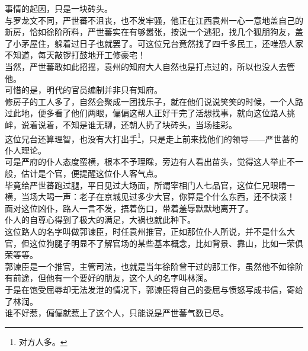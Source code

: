 \begin{multicols}{\theparacolNo}
事情的起因，只是一块砖头。\\

与罗龙文不同，严世蕃不沮丧，也不发牢骚，他正在江西袁州一心一意地盖自己的新房，恰如徐阶所料，严世蕃实在有够嚣张，按说一个逃犯，找几个狐朋狗友，盖了小茅屋住，躲着过日子也就罢了。可这位兄台竟然找了四千多民工，还唯恐人家不知道，每天敲锣打鼓地开工修豪宅！\\

当然，严世蕃敢如此招摇，袁州的知府大人自然也是打点过的，所以也没人去管他。\\

可惜的是，明代的官员编制并非只有知府。\\

修房子的工人多了，自然会聚成一团找乐子，就在他们说说笑笑的时候，一个人路过此地，便多看了他们两眼，偏偏这帮人正好干完了活想找事，就向这位路人挑衅，说着说着，不知是谁无聊，还朝人扔了块砖头，当场挂彩。\\

这位兄台还算理智，也没有大打出手\footnote{对方人多。}，只是走上前来找他们的领导——严世蕃的仆人理论。\\

可是严府的仆人态度蛮横，根本不予理睬，旁边有人看出苗头，觉得这人举止不一般，估计是个官，便提醒这位仆人客气点。\\

毕竟给严世蕃跑过腿，平日见过大场面，所谓宰相门人七品官，这位仁兄眼睛一横，当场大喝一声：老子在京城见过多少大官，你算是个什么东西，还不快滚！\\

面对这位凶仆，路人一言不发，捂着伤口，带着羞辱默默地离开了。\\

仆人的自尊心得到了极大的满足，大祸也就此种下。\\

这位路人的名字叫做郭谏臣，时任袁州推官，正如那位仆人所说，并不是什么大官，但这位狗腿子明显不了解官场的某些基本概念，比如背景、靠山，比如一荣俱荣等等。\\

郭谏臣是一个推官，主管司法，也就是当年徐阶曾干过的那工作，虽然他不如徐阶有前途，但他有一个要好的朋友，这个人的名字叫林润。\\

于是在饱受屈辱却无法发泄的情况下，郭谏臣将自己的委屈与愤怒写成书信，寄给了林润。\\

谁不好惹，偏偏就惹上了这个人，只能说是严世蕃气数已尽。\\


\end{multicols}
